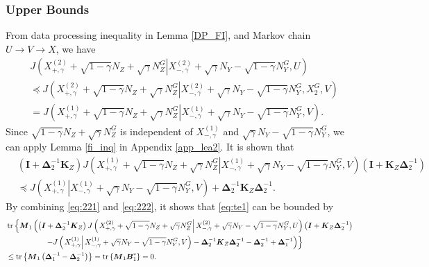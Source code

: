 \documentclass[journal,final, onecolumn]{IEEEtran}
\DeclareMathOperator{\tr}{tr}
\begin{document}
\subsubsection{Upper Bounds}
From data processing inequality in Lemma \ref{DP_FI}, and Markov chain $U \rightarrow V \rightarrow {X}$, we have
\begin{align}
& J\left( \left.X^{(2)}_{+, \gamma}+\sqrt{1-\gamma}N_{Z}+ \sqrt{\gamma}N_{Z}^{G} \right|X^{(2)}_{-, \gamma}+\sqrt{\gamma}N_{Y} - \sqrt{1-\gamma}N_{Y}^{G}, U \right) \nonumber \\
&\preceq J \left(     \left.X^{(2)}_{+, \gamma}+\sqrt{1-\gamma}N_{Z}+ \sqrt{\gamma}N_{Z}^{G} \right|X^{(2)}_{-, \gamma}+\sqrt{\gamma}N_{Y} - \sqrt{1-\gamma}N_{Y}^{G}, X_{2}^{G}, V       \right)\\
& = J \left(     \left.X^{(1)}_{+, \gamma}+\sqrt{1-\gamma}N_{Z}+ \sqrt{\gamma}N_{Z}^{G} \right|X^{(1)}_{-, \gamma}+\sqrt{\gamma}N_{Y} - \sqrt{1-\gamma}N_{Y}^{G}, V       \right). \label{eq:221}
\end{align}
Since $\sqrt{1-\gamma}N_{Z}+ \sqrt{\gamma}N_{Z}^{G}$ is independent of $X^{(1)}_{-, \gamma}$ and $\sqrt{\gamma}N_{Y} - \sqrt{1-\gamma}N_{Y}^{G}$, we can apply Lemma \ref{fi_inq} in Appendix \ref{app_lea2}. It is shown that
\begin{align}
&\left( \boldsymbol{I} + \boldsymbol{\Delta}^{-1}_{2}\boldsymbol{K}_{Z}  \right) J \left(     \left.X^{(1)}_{+, \gamma}+\sqrt{1-\gamma}N_{Z}+ \sqrt{\gamma}N_{Z}^{G} \right|X^{(1)}_{-, \gamma}+\sqrt{\gamma}N_{Y} - \sqrt{1-\gamma}N_{Y}^{G}, V       \right)\left( \boldsymbol{I} + \boldsymbol{K}_{Z}\boldsymbol{\Delta}^{-1}_{2}  \right) \nonumber \\
& \preceq J \left(     \left.X^{(1)}_{+, \gamma}\right|X^{(1)}_{-, \gamma}+\sqrt{\gamma}N_{Y} - \sqrt{1-\gamma}N_{Y}^{G}, V       \right)+ \boldsymbol{\Delta}^{-1}_{2}\boldsymbol{K}_{Z}\boldsymbol{\Delta}^{-1}_{2}. \label{eq:222}
\end{align}
By combining \eqref{eq:221} and \eqref{eq:222}, it shows that \eqref{eq:te1} can be bounded by
\begin{align}
&\tr \left\{   \boldsymbol{M}_{1}\left(\left( \boldsymbol{I} + \boldsymbol{\Delta}^{-1}_{2}\boldsymbol{K}_{Z}  \right) J\left( \left.X^{(2)}_{+, \gamma}+\sqrt{1-\gamma}N_{Z}+ \sqrt{\gamma}N_{Z}^{G} \right|X^{(2)}_{-, \gamma}+\sqrt{\gamma}N_{Y} - \sqrt{1-\gamma}N_{Y}^{G}, U \right)\left( \boldsymbol{I} + \boldsymbol{K}_{Z}\boldsymbol{\Delta}^{-1}_{2}  \right)\right.\right.\nonumber \\
& \hspace{0.7in} \left.\left. -  J \left(  \left. X^{(1)}_{+, \gamma}  \right| X^{(1)}_{-, \gamma}+\sqrt{\gamma}N_{Y} - \sqrt{1-\gamma}N_{Y}^{G}, V  \right) -\boldsymbol{\Delta}_{2}^{-1}\boldsymbol{K}_{Z}\boldsymbol{\Delta}_{2}^{-1}- \boldsymbol{\Delta}_{2}^{-1} + \boldsymbol{\Delta}_{1}^{-1}\right)        \right\}\nonumber \\
& \leq \tr \left\{   \boldsymbol{M}_{1}    \left(      \boldsymbol{\Delta}_{1}^{-1}- \boldsymbol{\Delta}_{2}^{-1}    \right)          \right\}= \tr \left\{  \boldsymbol{M}_{1} \boldsymbol{B}_{1}^{*}\right\}=0. \label{eq:tter1}
\end{align}
\end{document}
